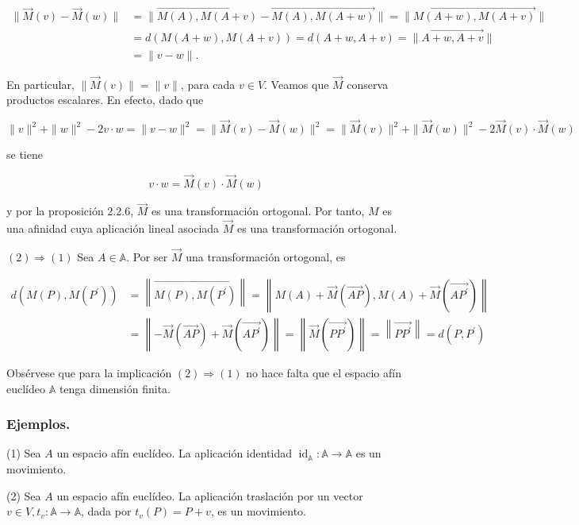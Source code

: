 \documentclass[12pt, a4paper, ones, notitlepage, openany,titlepage]{article}
\begin{document}
$$
\begin{aligned}
	\|\vec{M}(v)-\vec{M}(w)\| & =\|\overrightarrow{M(A), M(A+v)}-\overrightarrow{M(A), M(A+w)}\|=\|\overrightarrow{M(A+w), M(A+v)}\| \\
	& =d(M(A+w), M(A+v))=d(A+w, A+v)=\|\overrightarrow{A+w, A+v}\| \\
	& =\|v-w\| .
\end{aligned}
$$

En particular, $\|\vec{M}(v)\|=\|v\|$, para cada $v \in V$. Veamos que $\vec{M}$ conserva productos escalares. En efecto, dado que

$$
\|v\|^{2}+\|w\|^{2}-2 v \cdot w=\|v-w\|^{2}=\|\vec{M}(v)-\vec{M}(w)\|^{2}=\|\vec{M}(v)\|^{2}+\|\vec{M}(w)\|^{2}-2 \vec{M}(v) \cdot \vec{M}(w)
$$

se tiene

$$
v \cdot w=\vec{M}(v) \cdot \vec{M}(w)
$$

y por la proposición 2.2.6, $\vec{M}$ es una transformación ortogonal. Por tanto, $M$ es una afinidad cuya aplicación lineal asociada $\vec{M}$ es una transformación ortogonal.

$(2) \Rightarrow(1)$ Sea $A \in \mathbb{A}$. Por ser $\vec{M}$ una transformación ortogonal, es

$$
\begin{aligned}
	d\left(M(P), M\left(P^{\prime}\right)\right) & =\left\|\overrightarrow{M(P), M\left(P^{\prime}\right)}\right\|=\left\|M(A)+\vec{M}(\overrightarrow{A P}), M(A)+\vec{M}\left(\overrightarrow{A P^{\prime}}\right)\right\| \\
	& =\left\|-\vec{M}(\overrightarrow{A P})+\vec{M}\left(\overrightarrow{A P^{\prime}}\right)\right\|=\left\|\vec{M}\left(\overrightarrow{P P^{\prime}}\right)\right\|=\left\|\overrightarrow{P P^{\prime}}\right\|=d\left(P, P^{\prime}\right)
\end{aligned}
$$

Obsérvese que para la implicación $(2) \Rightarrow(1)$ no hace falta que el espacio afín euclídeo $\mathbb{A}$ tenga dimensión finita.

\subsubsection{Ejemplos.}
(1) Sea $A$ un espacio afín euclídeo. La aplicación identidad $\operatorname{id}_{\mathbb{A}}: \mathbb{A} \rightarrow \mathbb{A}$ es un movimiento.

(2) Sea $A$ un espacio afín euclídeo. La aplicación traslación por un vector $v \in V, t_{v}: \mathbb{A} \rightarrow \mathbb{A}$, dada por $t_{v}(P)=P+v$, es un movimiento.
\end{document}
